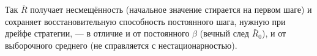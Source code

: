 \begin{solution}
    Так $\bar R$ получает несмещённость (начальное значение стирается на первом
    шаге) и сохраняет восстановительную способность постоянного шага, нужную при
    дрейфе стратегии, --- в отличие и от постоянного $\beta$ (вечный след $\bar
    R_0$), и от выборочного среднего (не справляется с нестационарностью).
\end{solution}
